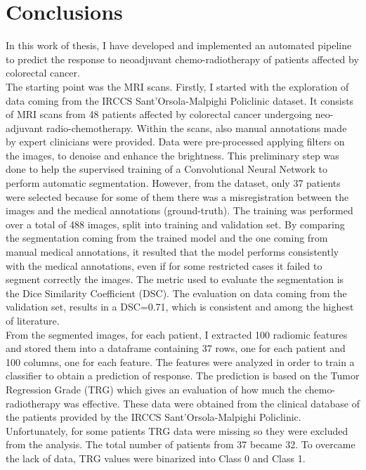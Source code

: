\documentclass{standalone}
\begin{document}
\chapter*{Conclusions}

In this work of thesis, I have developed and implemented an automated pipeline to predict the response to neoadjuvant chemo-radiotherapy of patients affected by colorectal cancer.\\
The starting point was the MRI scans.
Firstly, I started with the exploration of data coming from the IRCCS Sant'Orsola-Malpighi Policlinic dataset.
It consists of MRI scans from 48 patients affected by colorectal cancer undergoing neo-adjuvant radio-chemotherapy.
Within the scans, also manual annotations made by expert clinicians were provided.
Data were pre-processed applying filters on the images, to denoise and enhance the brightness.
This preliminary step was done to help the supervised training of a Convolutional Neural Network to perform automatic segmentation.
However, from the dataset, only 37 patients were selected because for some of them there was a misregistration between the images and the medical annotations (ground-truth).
The training was performed over a total of 488 images, split into training and validation set.
By comparing the segmentation coming from the trained model and the one coming from manual medical annotations, it resulted that the model performs consistently with the medical annotations, even if for some restricted cases it failed to segment correctly the images.
The metric used to evaluate the segmentation is the Dice Similarity Coefficient (DSC).
The evaluation on data coming from the validation set, results in a DSC=0.71, which is consistent and among the highest of literature.
\\
From the segmented images, for each patient, I extracted 100 radiomic features and stored them into a dataframe containing 37 rows, one for each patient and 100 columns, one for each feature.
The features were analyzed in order to train a classifier to obtain a prediction of response.
The prediction is based on the Tumor Regression Grade (TRG) which gives an evaluation of how much the chemo-radiotherapy was effective.
These data were obtained from the clinical database of the patients provided by the IRCCS Sant'Orsola-Malpighi Policlinic.
Unfortunately, for some patients TRG data were missing so they were excluded from the analysis. 
The total number of patients from 37 became 32.
To overcame the lack of data, TRG values were binarized into Class 0 and Class 1.
\end{document}
